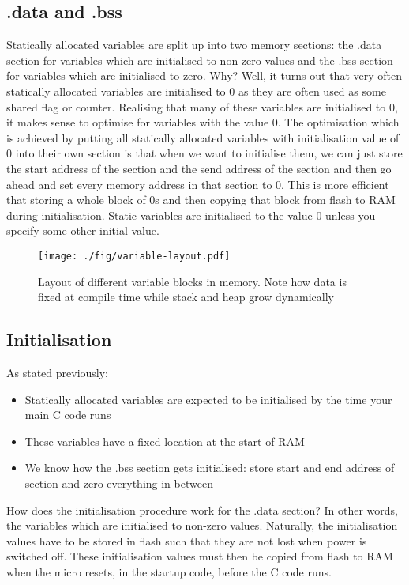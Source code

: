 \subsection{.data and .bss}
Statically allocated variables are split up into two memory sections: the .data section for variables which are initialised to non-zero values and the .bss section for variables which are initialised to zero.
Why? Well, it turns out that very often statically allocated variables are initialised to 0 as they are often used as some shared flag or counter. 
Realising that many of these variables are initialised to 0, it makes sense to optimise for variables with the value 0.
The optimisation which is achieved by putting all statically allocated variables with initialisation value of 0 into their own section is that when we want to initialise them, we can just store the start address of the section and the send address of the section and then go ahead and set every memory address in that section to 0.
This is more efficient that storing a whole block of 0s and then copying that block from flash to RAM during initialisation. 
Static variables are initialised to the value 0 unless you specify some other initial value.

\begin{figure}
    \centering
    \texttt{[image: ./fig/variable-layout.pdf]}
    \caption{Layout of different variable blocks in memory. Note how data is fixed at compile time while stack and heap grow dynamically}
    \label{fig:mem_allocation}
\end{figure}

\subsection{Initialisation}
As stated previously:
\begin{itemize}
  \item Statically allocated variables are expected to be initialised by the time your main C code runs
  \item These variables have a fixed location at the start of RAM
  \item We know how the .bss section gets initialised: store start and end address of section and zero everything in between
\end{itemize}
How does the initialisation procedure work for the .data section? In other words, the variables which are initialised to non-zero values.
Naturally, the initialisation values have to be stored in flash such that they are not lost when power is switched off.
These initialisation values must then be copied from flash to RAM when the micro resets, in the startup code, before the C code runs.

